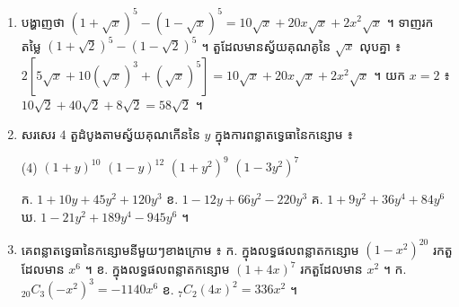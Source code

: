 \begin{enumerate}[1]
  \item បង្ហាញថា $(1 + \sqrt{x})^5 - (1 - \sqrt{x})^5 = 10\sqrt{x} + 20x\sqrt{x} + 2x^2\sqrt{x}$ ។ ទាញរកតម្លៃ $(1 + \sqrt{2})^5 - (1 - \sqrt{2})^5$ ។
  \ans
  តួដែលមានស្វ័យគុណគូនៃ $\sqrt{x}$ លុបគ្នា ៖ $2\left[5\sqrt{x} + 10(\sqrt{x})^3 + (\sqrt{x})^5\right] = 10\sqrt{x} + 20x\sqrt{x} + 2x^2\sqrt{x}$ ។ យក $x = 2$ ៖ $10\sqrt{2} + 40\sqrt{2} + 8\sqrt{2} = 58\sqrt{2}$ ។
  \item សរសេរ $4$ តួដំបូងតាមស្វ័យគុណកើននៃ $y$ ក្នុងការពន្លាតទ្វេធានៃកន្សោម ៖
  \begin{tasks}(4)
    \task $(1 + y)^{10}$
    \task $(1 - y)^{12}$
    \task $(1 + y^2)^9$
    \task $(1 - 3y^2)^7$
  \end{tasks}
  \ans
  ក. $1 + 10y + 45y^2 + 120y^3$ \quad ខ. $1 - 12y + 66y^2 - 220y^3$ \quad គ. $1 + 9y^2 + 36y^4 + 84y^6$ \quad ឃ. $1 - 21y^2 + 189y^4 - 945y^6$ ។
  \item គេពន្លាតទ្វេធានៃកន្សោមនីមួយៗខាងក្រោម ៖ \quad ក. ក្នុងលទ្ធផលពន្លាតកន្សោម $(1 - x^2)^{20}$ រកតួដែលមាន $x^6$ ។ \quad ខ. ក្នុងលទ្ធផលពន្លាតកន្សោម $(1 + 4x)^7$ រកតួដែលមាន $x^2$ ។
  \ans
  ក. ${}_{20}C_3(-x^2)^3 = -1140x^6$ \quad ខ. ${}_7C_2(4x)^2 = 336x^2$ ។
\end{enumerate}
